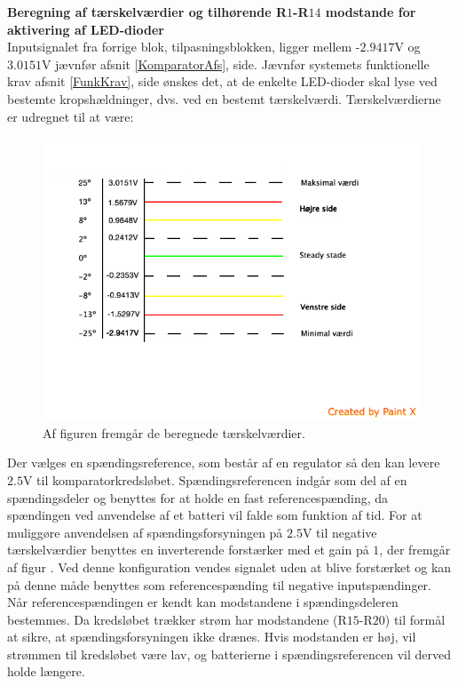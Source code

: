 \noindent\textbf{Beregning af tærskelværdier og tilhørende R$1$-R$14$ modstande for aktivering af LED-dioder} \\
Inputsignalet fra forrige blok, tilpasningsblokken, ligger mellem -$2.9417$V og $3.0151$V jævnfør afsnit \ref{KomparatorAfs}, side\pageref{KomparatorAfs}. Jævnfør systemets funktionelle krav afsnit \ref{FunkKrav}, side \pageref{FunkKrav} ønskes det, at de enkelte LED-dioder skal lyse ved bestemte kropshældninger, dvs. ved en bestemt tærskelværdi. %
Tærskelværdierne er udregnet til at være:
\begin{figure}[H]
	\centering
	\includegraphics[scale=0.5]{figures/cProblemloesning/Taerskelvaerdier.PNG}
	\caption{Af figuren fremgår de beregnede tærskelværdier.}
	\label{fig:taerskelvaerdier}
\end{figure}

Der vælges en  spændingsreference, som består af en regulator så den kan levere $2.5$V til komparatorkredsløbet. Spændingsreferencen indgår som del af en spændingsdeler og benyttes for at holde en fast referencespænding, da spændingen ved anvendelse af et batteri vil falde som funktion af tid. For at muliggøre anvendelsen af spændingsforsyningen på $2.5$V til negative tærskelværdier benyttes en inverterende forstærker med et gain på $1$, der fremgår af figur . Ved denne konfiguration vendes signalet uden at blive forstærket og kan på denne måde benyttes som referencespænding til negative inputspændinger.  
Når referencespændingen er kendt kan modstandene i spændingsdeleren bestemmes. Da kredsløbet trækker strøm har modstandene (R$15$-R$20$) til formål at sikre, at spændingsforsyningen ikke drænes. Hvis modstanden er høj, vil strømmen til kredsløbet være lav, og batterierne i spændingsreferencen vil derved holde længere.


